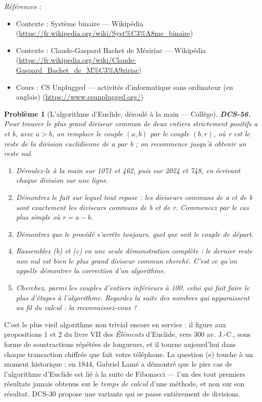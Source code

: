 \documentclass[11pt]{article}
\newtheorem{problem}{Problème}
\newenvironment{refs}{\par\small\noindent\emph{Références :}\begin{itemize}\setlength\itemsep{0pt}}{\end{itemize}\normalsize}
\begin{document}
\begin{refs}
\item Contexte : Système binaire --- Wikipédia (\url{https://fr.wikipedia.org/wiki/Syst%C3%A8me_binaire})
\item Contexte : Claude-Gaspard Bachet de Méziriac --- Wikipédia (\url{https://fr.wikipedia.org/wiki/Claude-Gaspard_Bachet_de_M%C3%A9ziriac})
\item Cours : CS Unplugged --- activités d'informatique sans ordinateur (en anglais) (\url{https://www.csunplugged.org/})
\end{refs}

\bigskip

\begin{problem}[{L'algorithme d'Euclide, déroulé à la main --- Collège}]
\textbf{DCS-56.} Pour trouver le plus grand diviseur commun de deux entiers strictement
positifs a et b, avec $ a > b $, on remplace le couple $ (a, b) $ par le couple
$ (b, r) $, où r est le reste de la division euclidienne de a par b ; on recommence
jusqu'à obtenir un reste nul.
\begin{enumerate}
\item[(a)] Déroulez-le à la main sur 1071 et 462, puis sur 2024 et 748, en écrivant chaque division
sur une ligne.
\item[(b)] Démontrez le fait sur lequel tout repose : les diviseurs communs de a et de b sont
exactement les diviseurs communs de b et de r. Commencez par le cas plus simple où
$ r = a - b $.
\item[(c)] Démontrez que le procédé s'arrête toujours, quel que soit le couple de départ.
\item[(d)] Rassemblez (b) et (c) en une seule démonstration complète : le dernier reste non nul est
bien le plus grand diviseur commun cherché. C'est ce qu'on appelle démontrer la correction
d'un algorithme.
\item[(e)] Cherchez, parmi les couples d'entiers inférieurs à 100, celui qui fait faire le plus
d'étapes à l'algorithme. Regardez la suite des nombres qui apparaissent au fil du calcul :
la reconnaissez-vous ?
\end{enumerate}

\end{problem}

\noindent C'est le plus vieil algorithme non trivial encore en service : il figure
aux propositions 1 et 2 du livre VII des \textit{Éléments} d'Euclide, vers 300 av. J.-C., sous
forme de soustractions répétées de longueurs, et il tourne aujourd'hui dans chaque
transaction chiffrée que fait votre téléphone. La question (e) touche à un moment
historique : en 1844, Gabriel Lamé a démontré que le pire cas de l'algorithme d'Euclide est
lié à la suite de Fibonacci --- l'un des tout premiers résultats jamais obtenus sur le
\textit{temps de calcul} d'une méthode, et non sur son résultat. DCS-30 propose une variante
qui se passe entièrement de divisions.
\end{document}

